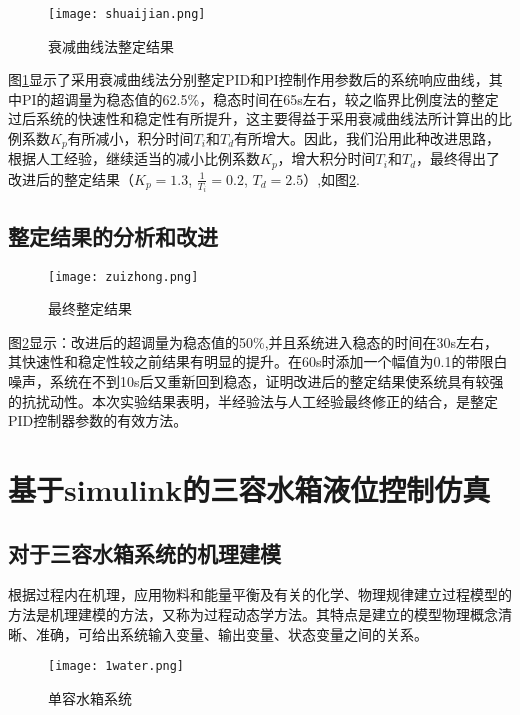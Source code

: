 \documentclass{WHUMaster}   %
\begin{document}
\begin{figure}[h]
	\small
	\centering
	\texttt{[image: shuaijian.png]}
	\caption{衰减曲线法整定结果} \label{fig4}
\end{figure}

图\ref{fig4}显示了采用衰减曲线法分别整定PID和PI控制作用参数后的系统响应曲线，其中PI的超调量为稳态值的62.5\%，稳态时间在65s左右，较之临界比例度法的整定过后系统的快速性和稳定性有所提升，这主要得益于采用衰减曲线法所计算出的比例系数$K_p$有所减小，积分时间$T_i$和$T_d$有所增大。因此，我们沿用此种改进思路，根据人工经验，继续适当的减小比例系数$K_p$，增大积分时间$T_i$和$T_d$，最终得出了改进后的整定结果（$K_p=1.3$,  $\frac{1}{T_i}=0.2$,  $T_d=2.5$）,如图\ref{fig5}.
\section{整定结果的分析和改进}

\begin{figure}[h]
	\small
	\centering
	\texttt{[image: zuizhong.png]}
	\caption{最终整定结果} \label{fig5}
\end{figure}
图\ref{fig5}显示：改进后的超调量为稳态值的50\%,并且系统进入稳态的时间在30s左右，其快速性和稳定性较之前结果有明显的提升。在60s时添加一个幅值为0.1的带限白噪声，系统在不到10s后又重新回到稳态，证明改进后的整定结果使系统具有较强的抗扰动性。本次实验结果表明，半经验法与人工经验最终修正的结合，是整定PID控制器参数的有效方法。


\chapter{基于simulink的三容水箱液位控制仿真}

\section{对于三容水箱系统的机理建模}
根据过程内在机理，应用物料和能量平衡及有关的化学、物理规律建立过程模型的方法是机理建模的方法，又称为过程动态学方法。其特点是建立的模型物理概念清晰、准确，可给出系统输入变量、输出变量、状态变量之间的关系。

\begin{figure}[h]
	\small
	\centering
	\texttt{[image: 1water.png]}
	\caption{单容水箱系统} \label{fig6}
\end{figure}
\end{document}
